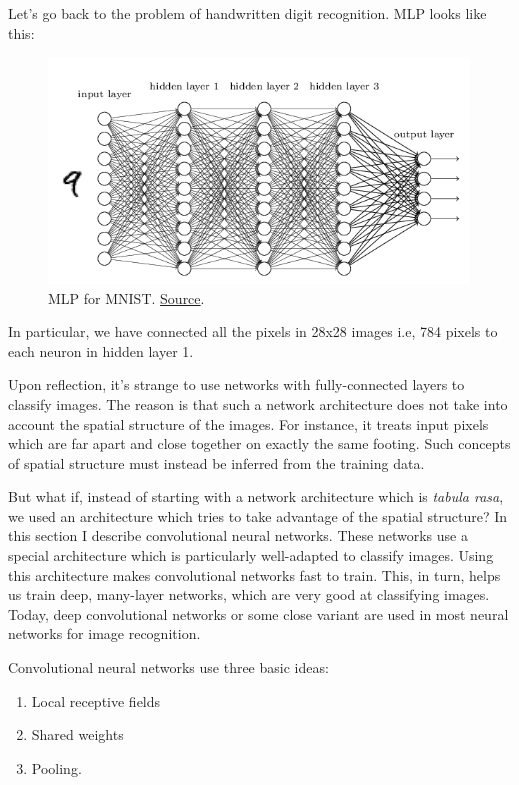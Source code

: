 \documentclass[a4paper]{tufte-handout}
\begin{document}
Let's go back to the problem of handwritten digit recognition. MLP looks
like this:

\begin{figure}
  \includegraphics[height=60mm]{mnist_net.png}
  \caption{MLP for MNIST.
  \href{http://neuralnetworksanddeeplearning.com/chap5.html\%22}{Source}.}
\end{figure}


In particular, we have connected all the pixels in 28x28 images i.e, 784
pixels to each neuron in hidden layer 1.

Upon reflection, it's strange to use networks with fully-connected
layers to classify images. The reason is that such a network
architecture does not take into account the spatial structure of the
images. For instance, it treats input pixels which are far apart and
close together on exactly the same footing. Such concepts of spatial
structure must instead be inferred from the training data.

But what if, instead of starting with a network architecture which is
\emph{tabula rasa}, we used an architecture which tries to take
advantage of the spatial structure? In this section I describe
convolutional neural networks. These networks use a special architecture
which is particularly well-adapted to classify images. Using this
architecture makes convolutional networks fast to train. This, in turn,
helps us train deep, many-layer networks, which are very good at
classifying images. Today, deep convolutional networks or some close
variant are used in most neural networks for image recognition.

Convolutional neural networks use three basic ideas:

\begin{enumerate}
\item
  Local receptive fields
\item
  Shared weights
\item
  Pooling.
\end{enumerate}
\end{document}
